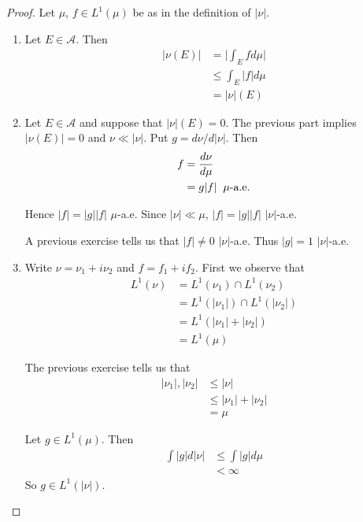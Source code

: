\documentclass[12pt]{amsart}
\theoremstyle{definition}
\newcommand{\MA}{\mathcal{A}}
\begin{document}
	\begin{proof}
		Let $\mu$, $f \in L^1(\mu)$ be as in the definition of $|\nu|$.
		\begin{enumerate}
			\item Let $E \in \MA$. Then 
			\begin{align*}
				|\nu(E)| 
				& = \bigg|\int_E f d\mu\bigg|\\
				& \leq \int_E |f| d\mu\\
				&= |\nu|(E)
			\end{align*}
			
			\item Let $E \in \MA$ and suppose that $|\nu|(E)=0$. The previous part implies $|\nu(E)|=0$ and $\nu \ll |\nu|$. Put $g = d \nu / d|\nu|$. Then 
			\begin{align*}
				f 
				&= \frac{d\nu}{d\mu}\\
				&= g|f| \hspace{2mm }\mu\text{-a.e.}
			\end{align*}
			
			Hence $|f| = |g||f|$ $\mu$-a.e. Since $|\nu| \ll \mu$, $|f| = |g||f|$ $|\nu|$-a.e.
			
			A previous exercise tells us that $|f| \neq 0$ $|\nu|$-a.e. Thus $|g|=1$ $|\nu|$-a.e.\\
			
			\item Write $\nu = \nu_1 + i\nu_2$ and $f = f_1 + if_2$. First we observe that
			\begin{align*}
				L^1(\nu)
				&= L^1(\nu_1) \cap L^1(\nu_2) \\
				&= L^1(|\nu_1|) \cap L^1(|\nu_2|)\\
				&= L^1(|\nu_1| + |\nu_2|)\\
				&= L^1(\mu)
			\end{align*}
			
			The previous exercise tells us that 
			\begin{align*}
				|\nu_1|, |\nu_2| 
				&\leq |\nu| \\
				&\leq |\nu_1|+ |\nu_2| \\
				&= \mu
			\end{align*}
			
			Let $g \in L^1(\mu)$. Then 
			\begin{align*}
				\int |g| d |\nu| 
				&\leq \int |g| d \mu \\
				&< \infty
			\end{align*}
			So $g \in L^1(|\nu|)$.
			

\end{enumerate}
\end{proof}
\end{document}
